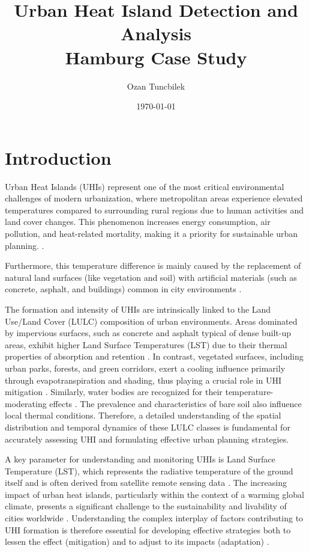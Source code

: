 \documentclass{article}
\title{Urban Heat Island Detection and Analysis \\ Hamburg Case Study}
\author{Ozan Tuncbilek}
\date{\today}
\begin{document}
\maketitle

\section{Introduction}
Urban Heat Islands (UHIs) represent one of the most critical environmental challenges of modern urbanization, where metropolitan areas experience elevated temperatures compared to surrounding rural regions due to human activities and land cover changes. This phenomenon increases energy consumption, air pollution, and heat-related mortality, making it a priority for sustainable urban planning. \parencite{Voogt2003}.  

Furthermore, this temperature difference is mainly caused by the replacement of natural land surfaces (like vegetation and soil) with artificial materials (such as concrete, asphalt, and buildings) common in city environments \parencite{rff_uhi101_2025}. 

The formation and intensity of UHIs are intrinsically linked to the Land Use/Land Cover (LULC) composition of urban environments. Areas dominated by impervious surfaces, such as concrete and asphalt typical of dense built-up areas, exhibit higher Land Surface Temperatures (LST) due to their thermal properties of absorption and retention \parencite{LULC_Impact_BuiltUp}. In contrast, vegetated surfaces, including urban parks, forests, and green corridors, exert a cooling influence primarily through evapotranspiration and shading, thus playing a crucial role in UHI mitigation \parencite{LULC_Impact_Vegetation}. Similarly, water bodies are recognized for their temperature-moderating effects \parencite{LULC_Impact_Water}. The prevalence and characteristics of bare soil also influence local thermal conditions. Therefore, a detailed understanding of the spatial distribution and temporal dynamics of these LULC classes is fundamental for accurately assessing UHI and formulating effective urban planning strategies.

A key parameter for understanding and monitoring UHIs is Land Surface Temperature (LST), which represents the radiative temperature of the ground itself and is often derived from satellite remote sensing data \parencite{nasa_uhi_part1_2025}. The increasing impact of urban heat islands, particularly within the context of a warming global climate, presents a significant challenge to the sustainability and livability of cities worldwide \parencite{planetlabs_lst_uhi_2025}. Understanding the complex interplay of factors contributing to UHI formation is therefore essential for developing effective strategies both to lessen the effect (mitigation) and to adjust to its impacts (adaptation) \parencite{ucar_uhi_2025}.
\end{document}
